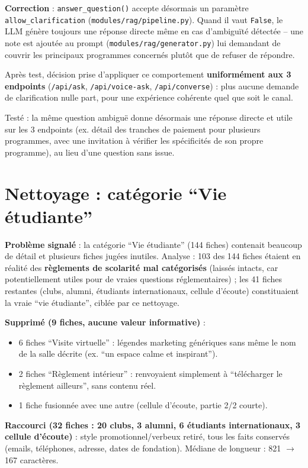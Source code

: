 \documentclass[11pt,a4paper]{report}
\begin{document}
\textbf{Correction} : \texttt{answer\_question()} accepte désormais un paramètre
\texttt{allow\_clarification} (\texttt{modules/rag/pipeline.py}). Quand il vaut
\texttt{False}, le LLM génère toujours une réponse directe même en cas d'ambiguïté
détectée -- une note est ajoutée au prompt (\texttt{modules/rag/generator.py}) lui
demandant de couvrir les principaux programmes concernés plutôt que de refuser de
répondre.

Après test, décision prise d'appliquer ce comportement \textbf{uniformément aux 3
endpoints} (\texttt{/api/ask}, \texttt{/api/voice-ask}, \texttt{/api/converse}) : plus
aucune demande de clarification nulle part, pour une expérience cohérente quel que soit
le canal.

Testé : la même question ambiguë donne désormais une réponse directe et utile sur les 3
endpoints (ex. détail des tranches de paiement pour plusieurs programmes, avec une
invitation à vérifier les spécificités de son propre programme), au lieu d'une question
sans issue.

\section{Nettoyage : catégorie ``Vie étudiante''}
\textbf{Problème signalé} : la catégorie ``Vie étudiante'' (144 fiches) contenait
beaucoup de détail et plusieurs fiches jugées inutiles. Analyse : 103 des 144 fiches
étaient en réalité des \textbf{règlements de scolarité mal catégorisés} (laissés
intacts, car potentiellement utiles pour de vraies questions réglementaires) ; les
41 fiches restantes (clubs, alumni, étudiants internationaux, cellule d'écoute)
constituaient la vraie ``vie étudiante'', ciblée par ce nettoyage.

\textbf{Supprimé (9 fiches, aucune valeur informative)} :
\begin{itemize}
    \item 6 fiches ``Visite virtuelle'' : légendes marketing génériques sans même le nom
    de la salle décrite (ex. ``un espace calme et inspirant'').
    \item 2 fiches ``Règlement intérieur'' : renvoyaient simplement à ``télécharger le
    règlement ailleurs'', sans contenu réel.
    \item 1 fiche fusionnée avec une autre (cellule d'écoute, partie 2/2 courte).
\end{itemize}

\textbf{Raccourci (32 fiches : 20 clubs, 3 alumni, 6 étudiants internationaux, 3 cellule
d'écoute)} : style promotionnel/verbeux retiré, tous les faits conservés (emails,
téléphones, adresse, dates de fondation). Médiane de longueur : 821 $\to$ 167 caractères.
\end{document}
